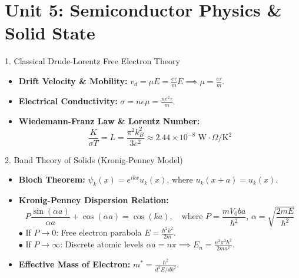 \chapter{Unit 5: Semiconductor Physics \& Solid State}

\begin{formulabox}{1. Classical Drude-Lorentz Free Electron Theory}
\begin{itemize}[leftmargin=*,itemsep=2pt]
    \item \textbf{Drift Velocity \& Mobility:} $v_d = \mu E = \frac{e\tau}{m} E \implies \mu = \frac{e\tau}{m}$.
    \item \textbf{Electrical Conductivity:} $\sigma = n e \mu = \frac{n e^2 \tau}{m}$.
    \item \textbf{Wiedemann-Franz Law \& Lorentz Number:}
    \[
    \frac{K}{\sigma T} = L = \frac{\pi^2 k_B^2}{3 e^2} \approx 2.44 \times 10^{-8}\text{ W}\cdot\Omega/\text{K}^2
    \]
\end{itemize}
\end{formulabox}

\begin{formulabox}{2. Band Theory of Solids (Kronig-Penney Model)}
\begin{itemize}[leftmargin=*,itemsep=2pt]
    \item \textbf{Bloch Theorem:} $\psi_k(x) = e^{ikx} u_k(x)$, where $u_k(x+a) = u_k(x)$.
    \item \textbf{Kronig-Penney Dispersion Relation:}
    \[
    P\frac{\sin(\alpha a)}{\alpha a} + \cos(\alpha a) = \cos(ka), \quad \text{where } P = \frac{m V_0 b a}{\hbar^2}, \, \alpha = \sqrt{\frac{2mE}{\hbar^2}}
    \]
    $\bullet$ If $P \to 0$: Free electron parabola $E = \frac{\hbar^2 k^2}{2m}$.\\
    $\bullet$ If $P \to \infty$: Discrete atomic levels $\alpha a = n\pi \implies E_n = \frac{n^2 \pi^2 \hbar^2}{2ma^2}$.
    \item \textbf{Effective Mass of Electron:} $m^* = \frac{\hbar^2}{d^2 E / dk^2}$.
\end{itemize}
\end{formulabox}

